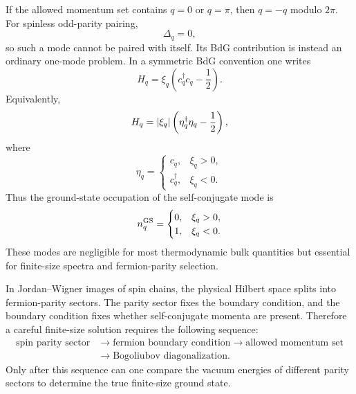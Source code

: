 If the allowed momentum set contains $q=0$ or $q=\pi$, then $q=-q$ modulo
$2\pi$.  For spinless odd-parity pairing,
\begin{equation}
    \Delta_q=0,
\end{equation}
so such a mode cannot be paired with itself.  Its BdG contribution is instead an
ordinary one-mode problem.  In a symmetric BdG convention one writes
\begin{equation}
\label{eq:bt-self-conjugate-bdg-term}
    H_q=\xi_q\left(c_q^\dagger c_q-\frac12\right).
\end{equation}
Equivalently,
\begin{equation}
\label{eq:bt-self-conjugate-diagonal}
    H_q=\left|\xi_q\right|\left(\eta_q^\dagger\eta_q-\frac12\right),
\end{equation}
where
\begin{equation}
    \eta_q=
    \begin{cases}
        c_q, & \xi_q>0,\\
        c_q^\dagger, & \xi_q<0.
    \end{cases}
\end{equation}
Thus the ground-state occupation of the self-conjugate mode is
\begin{equation}
\label{eq:bt-self-conjugate-occupation}
    n_q^{\rm GS}
    =
    \begin{cases}
        0, & \xi_q>0,\\
        1, & \xi_q<0.
    \end{cases}
\end{equation}
These modes are negligible for most thermodynamic bulk quantities but essential
for finite-size spectra and fermion-parity selection.

In Jordan--Wigner images of spin chains, the physical Hilbert space splits into
fermion-parity sectors.  The parity sector fixes the boundary condition, and the
boundary condition fixes whether self-conjugate momenta are present.  Therefore a
careful finite-size solution requires the following sequence:
\begin{equation}
\label{eq:bt-finite-size-sequence}
\begin{aligned}
    \text{spin parity sector}
    &\longrightarrow
    \text{fermion boundary condition}
    \longrightarrow
    \text{allowed momentum set}\\
    &\longrightarrow
    \text{Bogoliubov diagonalization}.
\end{aligned}
\end{equation}
Only after this sequence can one compare the vacuum energies of different parity
sectors to determine the true finite-size ground state.

